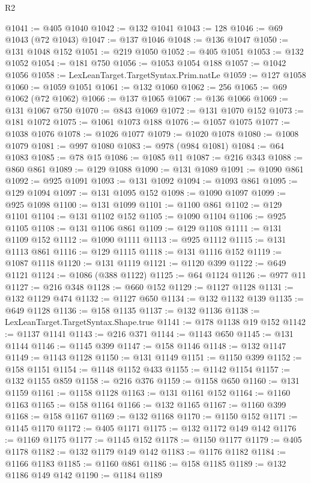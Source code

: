 \begin{lexlean}{R2}
\begin{coremodule}
@1041 := @405 @1040
@1042 := @132 @1041
@1043 := 128
@1046 := @69 @1043 (@72 @1043)
@1047 := @137 @1046
@1048 := @136 @1047
@1050 := @131 @1048 @152
@1051 := @219 @1050
@1052 := @405 @1051
@1053 := @132 @1052
@1054 := @181 @750
@1056 := @1053 @1054 @188
@1057 := @1042 @1056
@1058 := LexLeanTarget.TargetSyntax.Prim.natLe
@1059 := @127 @1058
@1060 := @1059 @1051
@1061 := @132 @1060
@1062 := 256
@1065 := @69 @1062 (@72 @1062)
@1066 := @137 @1065
@1067 := @136 @1066
@1069 := @131 @1067 @750
@1070 := @843 @1069
@1072 := @131 @1070 @152
@1073 := @181 @1072
@1075 := @1061 @1073 @188
@1076 := @1057 @1075
@1077 := @1038 @1076
@1078 := @1026 @1077
@1079 := @1020 @1078
@1080 := @1008 @1079
@1081 := @997 @1080
@1083 := @978 (@984 @1081)
@1084 := @64 @1083
@1085 := @78 @15
@1086 := @1085 @11
@1087 := @216 @343
@1088 := @860 @861
@1089 := @129 @1088
@1090 := @131 @1089
@1091 := @1090 @861
@1092 := @925 @1091
@1093 := @131 @1092
@1094 := @1093 @861
@1095 := @129 @1094
@1097 := @131 @1095 @152
@1098 := @1090 @1097
@1099 := @925 @1098
@1100 := @131 @1099
@1101 := @1100 @861
@1102 := @129 @1101
@1104 := @131 @1102 @152
@1105 := @1090 @1104
@1106 := @925 @1105
@1108 := @131 @1106 @861
@1109 := @129 @1108
@1111 := @131 @1109 @152
@1112 := @1090 @1111
@1113 := @925 @1112
@1115 := @131 @1113 @861
@1116 := @129 @1115
@1118 := @131 @1116 @152
@1119 := @1087 @1118
@1120 := @131 @1119
@1121 := @1120 @399
@1122 := @649 @1121
@1124 := @1086 (@388 @1122)
@1125 := @64 @1124
@1126 := @977 @11
@1127 := @216 @348
@1128 := @660 @152
@1129 := @1127 @1128
@1131 := @132 @1129 @474
@1132 := @1127 @650
@1134 := @132 @1132 @139
@1135 := @649 @1128
@1136 := @158 @1135
@1137 := @132 @1136
@1138 := LexLeanTarget.TargetSyntax.Shape.true
@1141 := @178 @1138 @19 @152
@1142 := @1137 @1141
@1143 := @216 @371
@1144 := @1143 @650
@1145 := @131 @1144
@1146 := @1145 @399
@1147 := @158 @1146
@1148 := @132 @1147
@1149 := @1143 @1128
@1150 := @131 @1149
@1151 := @1150 @399
@1152 := @158 @1151
@1154 := @1148 @1152 @433
@1155 := @1142 @1154
@1157 := @132 @1155 @859
@1158 := @216 @376
@1159 := @1158 @650
@1160 := @131 @1159
@1161 := @1158 @1128
@1163 := @131 @1161 @152
@1164 := @1160 @1163
@1165 := @158 @1164
@1166 := @132 @1165
@1167 := @1160 @399
@1168 := @158 @1167
@1169 := @132 @1168
@1170 := @1150 @152
@1171 := @1145 @1170
@1172 := @405 @1171
@1175 := @132 @1172 @149 @142
@1176 := @1169 @1175
@1177 := @1145 @152
@1178 := @1150 @1177
@1179 := @405 @1178
@1182 := @132 @1179 @149 @142
@1183 := @1176 @1182
@1184 := @1166 @1183
@1185 := @1160 @861
@1186 := @158 @1185
@1189 := @132 @1186 @149 @142
@1190 := @1184 @1189

\end{coremodule}
\end{lexlean}
